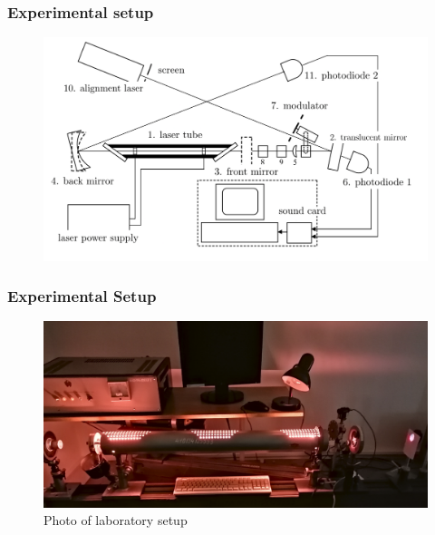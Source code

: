 \documentclass{beamer}
\begin{document}
	
	\begin{frame}
		\frametitle{Experimental setup}
		\begin{figure}
			\centering
			\includegraphics[width=1.1\linewidth]{res/experimental_setup.pdf}
		\end{figure}
		
	\end{frame}
	
	
	\begin{frame}
		\frametitle{Experimental Setup}
	
		\begin{figure}
			\centering
			\includegraphics[width=1\linewidth]{res/setup.png}
			\caption{Photo of laboratory setup}
		\end{figure}
	\end{frame}
	
\end{document}
